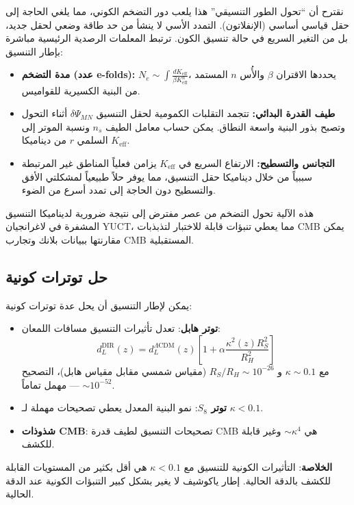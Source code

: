 \documentclass[11pt,a4paper]{article}
\begin{document}
	نقترح أن ``تحول الطور التنسيقي'' هذا يلعب دور التضخم الكوني، مما يلغي الحاجة إلى حقل قياسي أساسي (الإنفلاتون). التمدد الأسي لا ينشأ من حد طاقة وضعي لحقل جديد، بل من التغير السريع في حالة تنسيق الكون. ترتبط المعلمات الرصدية الرئيسية مباشرة بإطار التنسيق:
	\begin{itemize}
		\item \textbf{مدة التضخم (عدد e-folds):} $N_e \sim \int \frac{dK_{\mathrm{eff}}}{\beta K_{\mathrm{eff}}^n} $، يحددها الاقتران $\beta$ والأُس $n$ المستمد من البنية الكسيرية للقواميس.
		\item \textbf{طيف القدرة البدائي:} تتجمد التقلبات الكمومية لحقل التنسيق $\delta \Psi_{MN}$ أثناء التحول وتصبح بذور البنية واسعة النطاق. يمكن حساب معامل الطيف $n_s$ ونسبة الموتر إلى السلمي $r$ من ديناميكا $K_{\mathrm{eff}}$.
		\item \textbf{التجانس والتسطيح:} الارتفاع السريع في $K_{\mathrm{eff}}$ يزامن فعلياً المناطق غير المرتبطة سببياً من خلال ديناميكا حقل التنسيق، مما يوفر حلاً طبيعياً لمشكلتي الأفق والتسطيح دون الحاجة إلى تمدد أسرع من الضوء.
	\end{itemize}
	
	هذه الآلية تحول التضخم من عصر مفترض إلى نتيجة ضرورية لديناميكا التنسيق المشفرة في لاغرانجيان YUCT، مما يعطي تنبؤات قابلة للاختبار لتذبذبات CMB يمكن مقارنتها ببيانات بلانك وتجارب CMB المستقبلية.
	
	\subsection{حل توترات كونية}
	يمكن لإطار التنسيق أن يحل عدة توترات كونية:
	\begin{itemize}
		\item \textbf{توتر هابل}: تعدل تأثيرات التنسيق مسافات اللمعان:
		\begin{equation}
			d_L^{\text{DIR}}(z) = d_L^{\Lambda\text{CDM}}(z) \left[ 1 + \alpha \frac{\kappa^2(z) R_S^2}{R_H^2} \right]
		\end{equation}
		مع $\kappa \sim 0.1$ و $R_S/R_H \sim 10^{-26}$ (مقياس شمسي مقابل مقياس هابل)، التصحيح $\sim 10^{-52}$ — مهمل تماماً.
		
		\item \textbf{توتر $S_8$}: نمو البنية المعدل يعطي تصحيحات مهملة لـ $\kappa < 0.1$.
		
		\item \textbf{شذوذات CMB}: تصحيحات التنسيق لطيف قدرة CMB هي $\sim \kappa^4$ وغير قابلة للكشف.
	\end{itemize}
	\textbf{الخلاصة}: التأثيرات الكونية للتنسيق مع $\kappa < 0.1$ هي أقل بكثير من المستويات القابلة للكشف بالدقة الحالية. إطار ياكوشيف لا يغير بشكل كبير التنبؤات الكونية عند الدقة الحالية.
	
\end{document}
